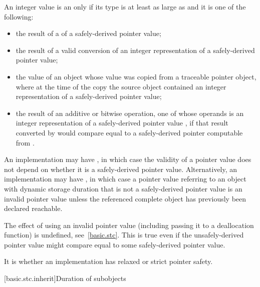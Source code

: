 \pnum
{}%
%
An integer value is an 
only if its type is at least as large as  and it is one of the
following:
\begin{itemize}
\item the result of a  of a safely-derived pointer value;

\item the result of a valid conversion of an integer representation of a safely-derived
pointer value;

\item the value of an object whose value was copied from a traceable pointer object,
where at the time of the copy the source object contained an integer representation of a
safely-derived pointer value;

\item the result of an additive or bitwise operation, one of whose operands is an
integer representation of a safely-derived pointer value , if that result
converted by  would compare equal to a safely-derived
pointer computable from .
\end{itemize}

\pnum
An implementation may have , in which case the
validity of a pointer value does not depend on whether it is a safely-derived
pointer value. Alternatively, an implementation may have , in which case a pointer value referring to an object with dynamic
storage duration that is not a safely-derived pointer
value is an invalid pointer value unless
the referenced complete object has previously been declared
reachable.
\begin{note}
The effect of using an invalid pointer value (including passing it to a
deallocation function) is undefined, see~\ref{basic.stc}.
This is true even if the unsafely-derived pointer value might compare equal to
some safely-derived pointer value.
\end{note}
It is
 whether an implementation has relaxed or strict pointer safety.%
%

[basic.stc.inherit]{Duration of subobjects}

